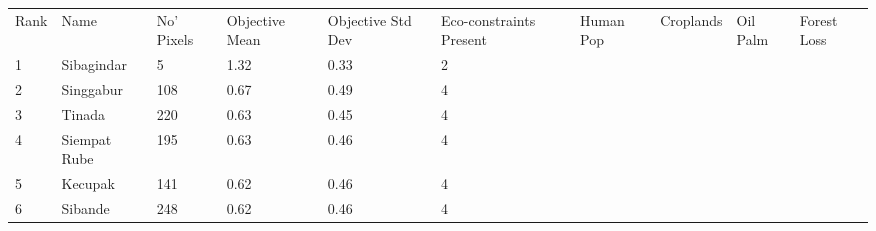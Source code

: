\begin{table}[ht]
\centering
\begingroup\fontsize{9pt}{10pt}\selectfont
\begin{tabular}{C{0.05\textwidth}C{0.15\textwidth}C{0.08\textwidth}C{0.08\textwidth}C{0.08\textwidth}C{0.08\textwidth}C{0.08\textwidth}C{0.08\textwidth}C{0.08\textwidth}C{0.08\textwidth}}
 Rank & Name & No' Pixels & Objective Mean & Objective Std Dev & Eco-constraints  Present & Human Pop & Croplands & Oil Palm & Forest Loss \\ 
 {1} & Sibagindar &   5 & \textcolor[HTML]{FFFFFF}{1.32} & \textcolor[HTML]{000000}{0.33} & \textcolor[HTML]{000000}{2} &  &  &  &  \\ 
  {2} & Singgabur & 108 & \textcolor[HTML]{000000}{0.67} & \textcolor[HTML]{FFFFFF}{0.49} & \textcolor[HTML]{FFFFFF}{4} &  &  &  &  \\ 
  {3} & Tinada & 220 & \textcolor[HTML]{000000}{0.63} & \textcolor[HTML]{FFFFFF}{0.45} & \textcolor[HTML]{FFFFFF}{4} &  &  &  &  \\ 
  {4} & Siempat Rube & 195 & \textcolor[HTML]{000000}{0.63} & \textcolor[HTML]{FFFFFF}{0.46} & \textcolor[HTML]{FFFFFF}{4} &  &  &  &  \\ 
  {5} & Kecupak & 141 & \textcolor[HTML]{000000}{0.62} & \textcolor[HTML]{FFFFFF}{0.46} & \textcolor[HTML]{FFFFFF}{4} &  &  &  &  \\ 
  {6} & Sibande & 248 & \textcolor[HTML]{000000}{0.62} & \textcolor[HTML]{FFFFFF}{0.46} & \textcolor[HTML]{FFFFFF}{4} &  &  &  &  \\ 

\end{tabular}
\end{table}
